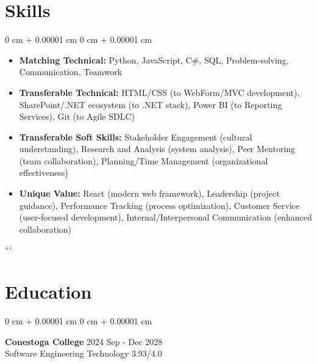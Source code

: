 \documentclass[10pt, letterpaper]{article}
\newenvironment{highlights}{
    \begin{itemize}[
        topsep=0.10 cm,
        parsep=0.10 cm,
        partopsep=0pt,
        itemsep=0pt,
        leftmargin=0 cm + 10pt
    ]
}{
    \end{itemize}
} %
\newenvironment{onecolentry}{
    \begin{adjustwidth}{
        0 cm + 0.00001 cm
    }{
        0 cm + 0.00001 cm
    }
}{
    \end{adjustwidth}
} %
\begin{document}
\section{Skills}
\begin{onecolentry}
\begin{highlights}
\item \textbf{Matching Technical:} Python, JavaScript, C\#, SQL, Problem-solving, Communication, Teamwork
\item \textbf{Transferable Technical:} HTML/CSS (to WebForm/MVC development), SharePoint/.NET ecosystem (to .NET stack), Power BI (to Reporting Services), Git (to Agile SDLC)
\item \textbf{Transferable Soft Skills:} Stakeholder Engagement (cultural understanding), Research and Analysis (system analysis), Peer Mentoring (team collaboration), Planning/Time Management (organizational effectiveness)
\item \textbf{Unique Value:} React (modern web framework), Leadership (project guidance), Performance Tracking (process optimization), Customer Service (user-focused development), Internal/Interpersonal Communication (enhanced collaboration)
\end{highlights}
\end{onecolentry}
```\section{Education}
\vspace{-13pt}
\hrulefill
\vspace{+3pt}
\begin{onecolentry}
 {\normalsize \textbf{Conestoga College}} \hfill {2024 Sep - Dec 2028}\\
 \vspace{+3pt}
 {Software Engineering Technology} \hfill {3.93/4.0}\\
  \vspace{-8pt}
  
   
\end{onecolentry}
 
\end{document}
